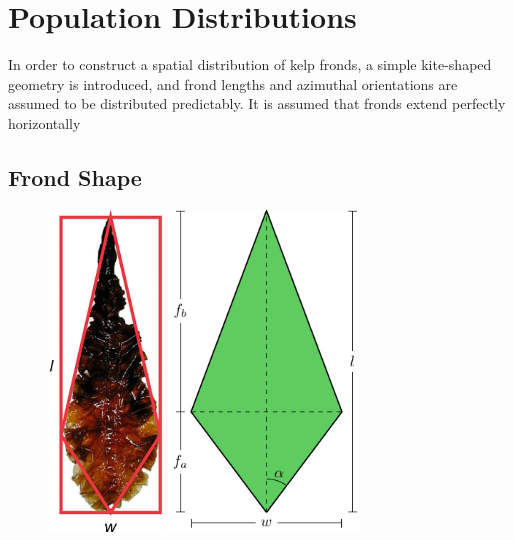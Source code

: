 \documentclass[ms,cpyr,lof,lot]{uathesis}
\begin{document}
\section{Population Distributions}
In order to construct a spatial distribution of kelp fronds, a simple kite-shaped geometry is introduced,
and frond lengths and azimuthal orientations are assumed to be distributed predictably.
It is assumed that fronds extend perfectly horizontally 

\subsection{Frond Shape}
\label{sec:shape}

\begin{figure}[h]
	\centering
  \includegraphics[width=1.2in]{kelp_photo/kite}
  \qquad
	\includegraphics[width=2in]{frond}
	\label{fig:frond}
\end{figure}
\end{document}
